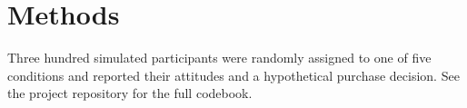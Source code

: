 \section{Methods}

Three hundred simulated participants were randomly assigned to one of five
conditions and reported their attitudes and a hypothetical purchase
decision. See the project repository for the full codebook.
